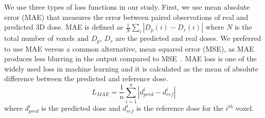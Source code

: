 \documentclass[10pt]{article}
\newcommand{\norm}[1]{\left\lVert#1\right\rVert}
\begin{document}


We use three types of loss functions in our study. First, we use mean absolute error (MAE) that measures the error between paired observations of real and predicted 3D dose. MAE is defined as $\frac{1}{N}\sum_i|D_p(i) - D_r(i)|$ where $N$ is the total number of voxels and $D_p$, $D_r$ are the predicted and real doses. We preferred to use MAE versus a common alternative, mean squared error (MSE), as MAE produces less blurring in the output compared to MSE~\cite{pix2pix2017}. {MAE loss is one of the widely used loss in machine learning and it is calculated as the mean of absolute difference between the predicted and reference dose. 
\begin{equation}
L_{MAE} = \frac{1}{n}\sum_{i=1}^{n} |d_{pred}^{i} - d_{ref}^{i}|
\end{equation}
where $d_{pred}^{i}$ is the predicted dose and $d_{ref}^{i}$ is the reference dose for the $i^{th}$ voxel.}
\end{document}
